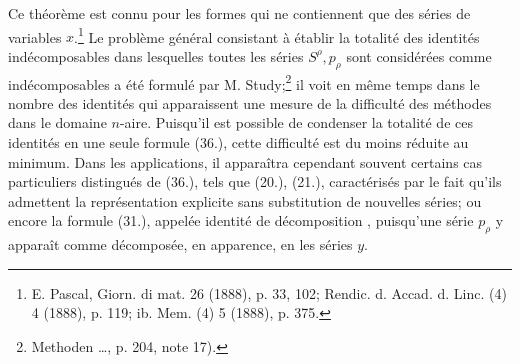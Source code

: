 \documentclass[11pt]{article}
\begin{document}
Ce théorème est connu pour les formes qui ne contiennent que des séries de variables $x$.\footnote{E. Pascal, Giorn. di mat. 26 (1888), p. 33, 102; Rendic. d. Accad. d. Linc. (4) 4 (1888), p. 119; ib. Mem. (4) 5 (1888), p. 375.} Le problème général consistant à établir la totalité des identités indécomposables dans lesquelles toutes les séries $S^\rho,p_\rho$ sont considérées comme indécomposables a été formulé par M. Study;\footnote{\og Methoden \dots \fg{}, p. 204, note 17).} il voit en même temps dans le nombre des identités qui apparaissent une mesure de la difficulté des méthodes dans le domaine $n$-aire. Puisqu'il est possible de condenser la totalité de ces identités en une seule formule (36.), cette difficulté est du moins réduite au minimum. Dans les applications, il apparaîtra cependant souvent certains cas particuliers distingués de (36.), tels que (20.), (21.), caractérisés par le fait qu'ils admettent la représentation explicite sans substitution de nouvelles séries; ou encore la formule (31.), appelée \og identité de décomposition \fg{}, puisqu'une série $p_\rho$ y apparaît comme décomposée, en apparence, en les séries $y$.
\end{document}
